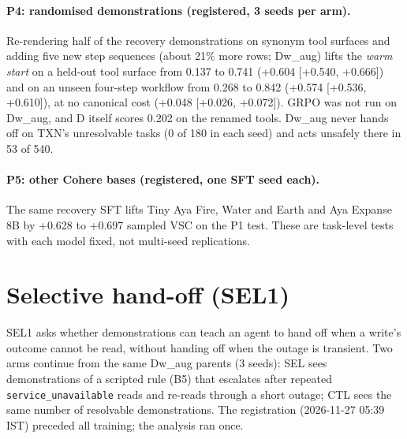 \documentclass[11pt]{article}
\newcommand{\code}[1]{\texttt{\small #1}}
\begin{document}
\paragraph{P4: randomised demonstrations (registered, 3 seeds per arm).} Re-rendering half of the recovery
demonstrations on synonym tool surfaces and adding five new step sequences (about 21\% more rows; Dw\_aug) lifts the
\emph{warm start} on a held-out tool surface from 0.137 to 0.741 (+0.604 [+0.540, +0.666]) and on an unseen four-step
workflow from 0.268 to 0.842 (+0.574 [+0.536, +0.610]), at no canonical cost (+0.048 [+0.026, +0.072]). GRPO was not
run on Dw\_aug, and D itself scores 0.202 on the renamed tools. Dw\_aug never hands off on TXN's unresolvable tasks
(0 of 180 in each seed) and acts unsafely there in 53 of 540.

\paragraph{P5: other Cohere bases (registered, one SFT seed each).} The same recovery SFT lifts Tiny Aya Fire,
Water and Earth and Aya Expanse 8B \citep{dang2024ayaexpanse} by +0.628 to +0.697 sampled VSC on the P1 test. These are
task-level tests with each model fixed, not multi-seed replications.

\section{Selective hand-off (SEL1)}
\label{sec:sel1}

SEL1 asks whether demonstrations can teach an agent to hand off when a write's outcome cannot be read, without
handing off when the outage is transient. Two arms continue from the same Dw\_aug parents (3 seeds): SEL sees
demonstrations of a scripted rule (B5) that escalates after repeated \code{service\_unavailable} reads and re-reads
through a short outage; CTL sees the same number of resolvable demonstrations. The registration (2026-11-27 05:39 IST)
preceded all training; the analysis ran once.
\end{document}
